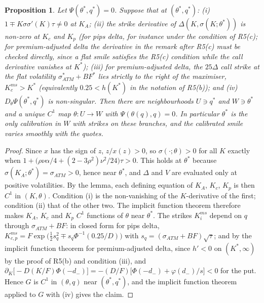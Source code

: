 \documentclass[11pt]{article}
\newtheorem{proposition}{Proposition}
\theoremstyle{remark}
\begin{document}
\begin{proposition}
Let $\Psi(\theta^*,q^*)=0$. Suppose that at $(\theta^*,q^*)$: (i) $1\mp K\sigma\sigma'(K)\tau\ne0$ at $K_A$; (ii) the strike derivative of $\Delta(K,\sigma(K;\theta^*))$ is non-zero at $K_c$ and $K_p$ (for pips delta, for instance under the condition of R5(c); for premium-adjusted delta the derivative in the remark after R5(c) must be checked directly, since a flat smile satisfies the R5(c) condition while the call derivative vanishes at $K^*$); (iii) for premium-adjusted delta, the $25\Delta$ call strike at the flat volatility $\sigma^*_{ATM}+BF^*$ lies strictly to the right of the maximiser, $K^{ms}_c>K^*$ (equivalently $0.25<h(K^*)$ in the notation of R5(b)); and (iv) $D_\theta \Psi(\theta^*,q^*)$ is non-singular. Then there are neighbourhoods $U\ni q^*$ and $W\ni\theta^*$ and a unique $C^1$ map $\theta:U\to W$ with $\Psi(\theta(q),q)=0$. In particular $\theta^*$ is the only calibration in $W$ with strikes on these branches, and the calibrated smile varies smoothly with the quotes.
\end{proposition}

\begin{proof}
Since $x$ has the sign of $z$, $z/x(z)>0$, so $\sigma(\cdot;\theta)>0$ for all $K$ exactly when $1+\bigl(\rho\nu\alpha/4+(2-3\rho^2)\nu^2/24\bigr)\tau>0$. This holds at $\theta^*$ because $\sigma(K_A;\theta^*)=\sigma_{ATM}>0$, hence near $\theta^*$, and $\Delta$ and $V$ are evaluated only at positive volatilities. By the lemma, each defining equation of $K_A$, $K_c$, $K_p$ is then $C^1$ in $(K,\theta)$. Condition (i) is the non-vanishing of the $K$-derivative of the first; condition (ii) that of the other two. The implicit function theorem therefore makes $K_A$, $K_c$ and $K_p$ $C^1$ functions of $\theta$ near $\theta^*$. The strikes $K^{ms}_i$ depend on $q$ through $\sigma_{ATM}+BF$: in closed form for pips delta, $K^{ms}_{c,p}=F\exp\bigl(\tfrac12s_q^2\mp s_q\Phi^{-1}(0.25/D)\bigr)$ with $s_q=(\sigma_{ATM}+BF)\sqrt\tau$; and by the implicit function theorem for premium-adjusted delta, since $h'<0$ on $(K^*,\infty)$ by the proof of R5(b) and condition (iii), and $\partial_K\bigl[-D(K/F)\Phi(-d_-)\bigr]=-(D/F)\bigl[\Phi(-d_-)+\varphi(d_-)/s\bigr]<0$ for the put. Hence $G$ is $C^1$ in $(\theta,q)$ near $(\theta^*,q^*)$, and the implicit function theorem applied to $G$ with (iv) gives the claim.
\end{proof}
\end{document}
